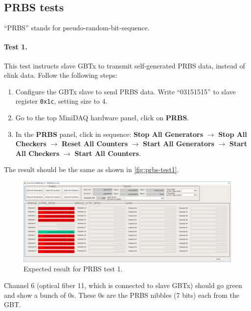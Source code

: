 \subsection{PRBS tests} \label{appx:prbs}
``PRBS'' stands for pseudo-random-bit-sequence.

\paragraph{Test 1.}
This test instructs slave GBTx to transmit self-generated PRBS data, instead of
elink data.
Follow the following steps:
\begin{enumerate}
    \item Configure the GBTx slave to send PRBS data. Write ``03151515'' to
        slave register \texttt{0x1c}, setting size to 4.
    \item Go to the top MiniDAQ hardware panel, click on \textbf{PRBS}.
    \item In the \textbf{PRBS} panel, click in sequence:
        \textbf{Stop All Generators} $\to$ \textbf{Stop All Checkers} $\to$
        \textbf{Reset All Counters} $\to$
        \textbf{Start All Generators} $\to$ \textbf{Start All Checkers} $\to$
        \textbf{Start All Counters}.
\end{enumerate}

The result should be the same as shown in \autoref{fig:prbs-test1}.

\begin{figure}[ht]
    \centering
    \includegraphics[width=\textwidth]{res/prbs_test1.png}
    \caption{Expected result for PRBS test 1.}
    \label{fig:prbs-test1}
\end{figure}

\begin{leftbar}
    Channel 6 (optical fiber 11, which is connected to slave GBTx) should go
    green and show a bunch of 0s.
    These 0s are the PRBS nibbles (7 bits) each from the GBT.
\end{leftbar}

